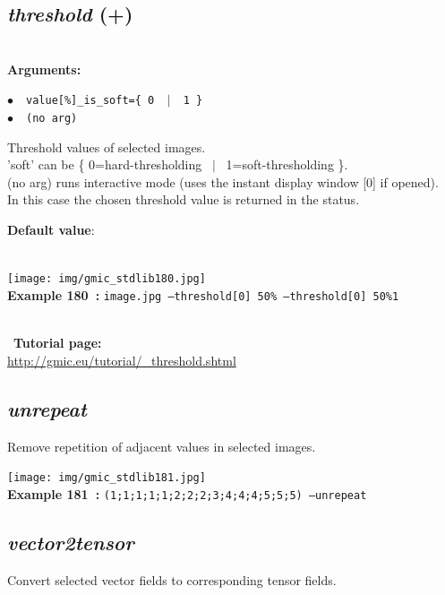 \documentclass[a4paper,10.5pt,twoside]{book}
\def\comma{\discretionary{,}{}{,}}
\newcommand{\Cb}[1]{\textcolor{cb}{#1}}
\newcommand{\Cc}[1]{\textcolor{cc}{#1}}
\begin{document}
\subsection{\emph{threshold} (+)}\vspace*{-0.7em}
~\\\textbf{\Cb{Arguments: }}\begin{flushleft}
{\small \Cb{\hspace*{0.5cm}$\bullet$~~\texttt{value[\%]{\comma}\_is\_soft=\{ 0 ~$|$~ 1 \}}}}~~~\\
{\small \Cb{\hspace*{0.5cm}$\bullet$~~\texttt{(no arg)}}}\end{flushleft}
Threshold values of selected images.
~\\'soft' can be \{ 0=hard-thresholding ~$|$~ 1=soft-thresholding \}.
~\\(no arg) runs interactive mode (uses the instant display window [0] if opened).
~\\In this case{\comma} the chosen threshold value is returned in the status.
\begin{flushleft}\Cc{\textbf{Default value}:\\~\\\hspace*{0.5cm}{\small $\bullet$~~\texttt{'is\_soft=0'.}}}\end{flushleft}
\begin{center}\texttt{[image: img/gmic\_stdlib180.jpg]}\\
{\footnotesize \textbf{Example 180~:} \texttt{image.jpg --threshold[0] 50\% --threshold[0] 50\%{\comma}1}}
\end{center}
~\\
~\textbf{Tutorial page: }\\\url{http://gmic.eu/tutorial/\_threshold.shtml}


\subsection{\emph{unrepeat} }\vspace*{-0.7em}
Remove repetition of adjacent values in selected images.
\begin{center}\texttt{[image: img/gmic\_stdlib181.jpg]}\\
{\footnotesize \textbf{Example 181~:} \texttt{(1;1;1;1;1;2;2;2;3;4;4;4;5;5;5) --unrepeat}}
\end{center}

\subsection{\emph{vector2tensor} }\vspace*{-0.7em}
Convert selected vector fields to corresponding tensor fields.
\end{document}
